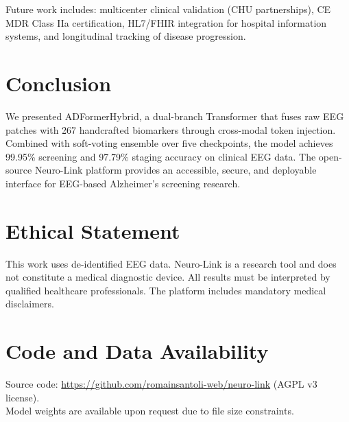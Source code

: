 \documentclass[twocolumn,11pt]{article}
\begin{document}
Future work includes: multicenter clinical validation (CHU partnerships), CE MDR Class IIa certification, HL7/FHIR integration for hospital information systems, and longitudinal tracking of disease progression.

\section{Conclusion}

We presented ADFormerHybrid, a dual-branch Transformer that fuses raw EEG patches with 267 handcrafted biomarkers through cross-modal token injection. Combined with soft-voting ensemble over five checkpoints, the model achieves 99.95\% screening and 97.79\% staging accuracy on clinical EEG data. The open-source Neuro-Link platform provides an accessible, secure, and deployable interface for EEG-based Alzheimer's screening research.

\section*{Ethical Statement}

This work uses de-identified EEG data. Neuro-Link is a research tool and does not constitute a medical diagnostic device. All results must be interpreted by qualified healthcare professionals. The platform includes mandatory medical disclaimers.

\section*{Code and Data Availability}

Source code: \url{https://github.com/romainsantoli-web/neuro-link} (AGPL v3 license).\\
Model weights are available upon request due to file size constraints.
\end{document}
